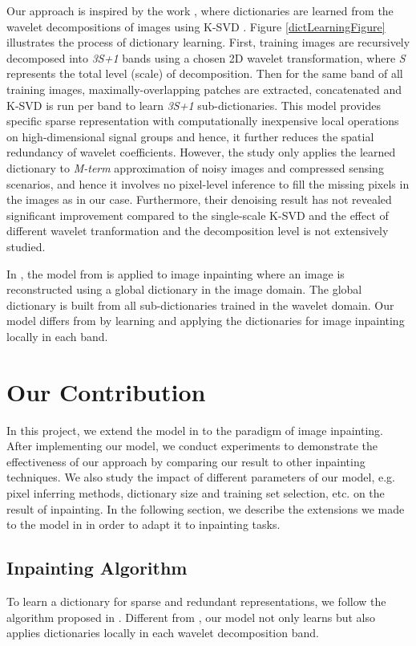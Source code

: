 \documentclass[conference]{IEEEtran}
\begin{document}
Our approach is inspired by the work \cite{multiscaleDictLearning}, where dictionaries are learned from the wavelet decompositions of images using K-SVD \cite{ksvd}. Figure \ref{dictLearningFigure} illustrates the process of dictionary learning. First, training images are recursively decomposed into \emph{3S+1} bands using a chosen 2D wavelet transformation, where \emph{S} represents the total level (scale) of decomposition. Then for the same band of all training images, maximally-overlapping patches are extracted, concatenated and K-SVD is run per band to learn \emph{3S+1} sub-dictionaries. This model provides specific sparse representation with computationally inexpensive local operations on high-dimensional signal groups and hence, it further reduces the spatial redundancy of wavelet coefficients. However, the study only applies the learned dictionary to \textit{M-term} approximation of noisy images and compressed sensing scenarios, and hence it involves no pixel-level inference to fill the missing pixels in the images as in our case. Furthermore, their denoising result has not revealed significant improvement compared to the single-scale K-SVD and the effect of different wavelet tranformation and the decomposition level is not extensively studied.

In \cite{imageInpaintingAlgo}, the model from \cite{multiscaleDictLearning} is applied to image inpainting where an image is reconstructed using a global dictionary in the image domain. The global dictionary is built from all sub-dictionaries trained in the wavelet domain. Our model differs from \cite{imageInpaintingAlgo} by learning and applying the dictionaries for image inpainting locally in each band. 


\section{Our Contribution}\label{contribution}
In this project, we extend the model in \cite{multiscaleDictLearning} to the paradigm of image inpainting. After implementing our model, we conduct experiments to demonstrate the effectiveness of our approach by comparing our result to other inpainting techniques. We also study the impact of different parameters of our model, e.g. pixel inferring methods, dictionary size and training set selection, etc. on the result of inpainting. In the following section, we describe the extensions we made to the model in \cite{multiscaleDictLearning} in order to adapt it to inpainting tasks.

\subsection{Inpainting Algorithm}
To learn a dictionary for sparse and redundant representations, we follow the algorithm proposed in \cite{multiscaleDictLearning}. Different from \cite{imageInpaintingAlgo}, our model not only learns but also applies dictionaries locally in each wavelet decomposition band.
\end{document}
